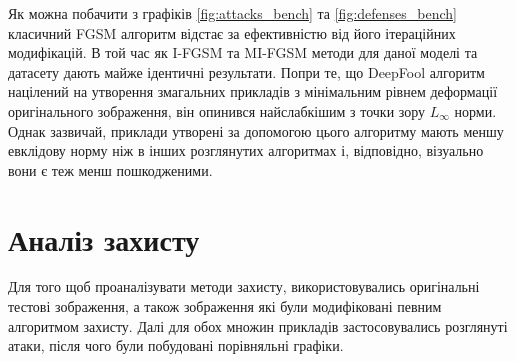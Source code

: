 \documentclass[a4paper,14pt]{extreport}
\begin{document}
	Як можна побачити з графіків \ref{fig:attacks_bench} та \ref{fig:defenses_bench} класичний FGSM алгоритм відстає за ефективністю від його  ітераційних модифікацій. В той час як I-FGSM та MI-FGSM методи для даної моделі та датасету дають майже ідентичні результати. Попри те, що DeepFool алгоритм націлений на утворення змагальних прикладів з мінімальним рівнем деформації оригінального зображення, він опинився найслабкішим з точки зору $L_{\infty}$ норми. Однак зазвичай, приклади утворені за допомогою цього алгоритму мають меншу евклідову норму ніж в інших розглянутих алгоритмах і, відповідно, візуально вони є теж менш пошкодженими. 
	
	\section{Аналіз захисту}
	Для того щоб проаналізувати методи захисту, використовувались оригінальні тестові зображення, а також зображення які були модифіковані певним алгоритмом захисту. Далі для обох множин прикладів застосовувались розглянуті атаки, після чого були побудовані порівняльні графіки.
\end{document}
